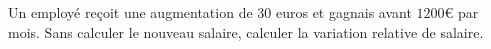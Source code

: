 
\begin{exercice}\label{exosmath-0031}

    Un employé reçoit une augmentation de \( 30\) euros et gagnais avant \( 1200€\) par mois. Sans calculer le nouveau salaire, calculer la variation relative de salaire.

\end{exercice}
